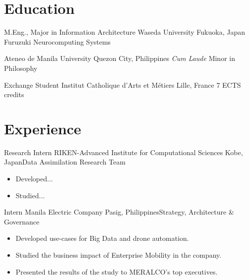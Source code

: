 \documentclass[11pt,a4paper,sans]{moderncv}
\begin{document}
\maketitle


\section{Education}
        {M.Eng., Major in Information Architecture}
        {Waseda University}
        {Fukuoka, Japan}{}
        {Furuzuki Neurocomputing Systems}

        {Ateneo de Manila University}
        {Quezon City, Philippines}
        {\textit{Cum Laude}}
        {Minor in Philosophy}

        {Exchange Student}
        {Institut Catholique d'Arts et M\'etiers}
        {Lille, France}{}
        {7 ECTS credits}

\section{Experience}

        {Research Intern}
        {RIKEN-Advanced Institute for Computational Sciences}
        {Kobe, Japan}{Data Assimilation Research Team}
        {
            \begin{itemize}
                \item Developed...
                \item Studied... 
            \end{itemize}
        }

        {Intern}
        {Manila Electric Company}
        {Pasig, Philippines}{Strategy, Architecture \& Governance}
        {
            \begin{itemize}
                \item Developed use-cases for Big Data and drone automation.
                \item Studied the business impact of Enterprise Mobility in the company.
                \item Presented the results of the study to MERALCO's top executives.
            \end{itemize}
        }
\end{document}
